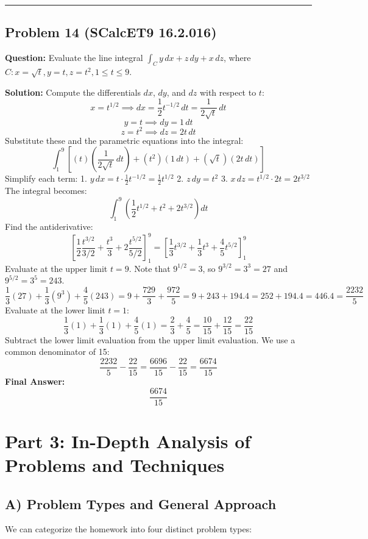 \documentclass{article}
\begin{document}
\hrule \vspace{0.5cm}

\subsection{Problem 14 (SCalcET9 16.2.016)}
\textbf{Question:} Evaluate the line integral $\int_C y \, dx + z \, dy + x \, dz$, where $C: x = \sqrt{t}, y = t, z = t^2, 1 \leq t \leq 9$.

\textbf{Solution:}
Compute the differentials $dx$, $dy$, and $dz$ with respect to $t$:
\[ x = t^{1/2} \implies dx = \frac{1}{2}t^{-1/2} \, dt = \frac{1}{2\sqrt{t}} \, dt \]
\[ y = t \implies dy = 1 \, dt \]
\[ z = t^2 \implies dz = 2t \, dt \]
Substitute these and the parametric equations into the integral:
\[ \int_1^9 \left[ (t)\left(\frac{1}{2\sqrt{t}} \, dt\right) + (t^2)(1 \, dt) + (\sqrt{t})(2t \, dt) \right] \]
Simplify each term:
1. $y \, dx = t \cdot \frac{1}{2}t^{-1/2} = \frac{1}{2}t^{1/2}$
2. $z \, dy = t^2$
3. $x \, dz = t^{1/2} \cdot 2t = 2t^{3/2}$
The integral becomes:
\[ \int_1^9 \left( \frac{1}{2}t^{1/2} + t^2 + 2t^{3/2} \right) dt \]
Find the antiderivative:
\[ \left[ \frac{1}{2} \frac{t^{3/2}}{3/2} + \frac{t^3}{3} + 2 \frac{t^{5/2}}{5/2} \right]_1^9 = \left[ \frac{1}{3}t^{3/2} + \frac{1}{3}t^3 + \frac{4}{5}t^{5/2} \right]_1^9 \]
Evaluate at the upper limit $t = 9$. Note that $9^{1/2} = 3$, so $9^{3/2} = 3^3 = 27$ and $9^{5/2} = 3^5 = 243$.
\[ \frac{1}{3}(27) + \frac{1}{3}(9^3) + \frac{4}{5}(243) = 9 + \frac{729}{3} + \frac{972}{5} = 9 + 243 + 194.4 = 252 + 194.4 = 446.4 = \frac{2232}{5} \]
Evaluate at the lower limit $t = 1$:
\[ \frac{1}{3}(1) + \frac{1}{3}(1) + \frac{4}{5}(1) = \frac{2}{3} + \frac{4}{5} = \frac{10}{15} + \frac{12}{15} = \frac{22}{15} \]
Subtract the lower limit evaluation from the upper limit evaluation. We use a common denominator of 15:
\[ \frac{2232}{5} - \frac{22}{15} = \frac{6696}{15} - \frac{22}{15} = \frac{6674}{15} \]
\textbf{Final Answer:} 
\[ \frac{6674}{15} \]

\newpage

\section{Part 3: In-Depth Analysis of Problems and Techniques}

\subsection{A) Problem Types and General Approach}
We can categorize the homework into four distinct problem types:
\end{document}
